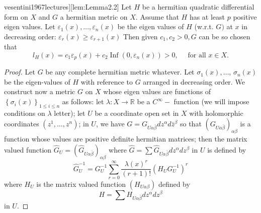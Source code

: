 \documentclass[lang=en,12pt]{beautybook}
\begin{document}
\begin{lemma}[][\cite[Lemma 2.2 by E. Calabi, P80]{vesentini1967lectures}][lem:Lemma2.2]
  Let $H$ be a hermitian quadratic differential form on $X$ and $G$ a hermitian metric on $X$. Assume that $H$ has at least $p$ positive eigen values. Let $\varepsilon_1(x), \ldots, \varepsilon_n(x)$ be the eigen values of $H$ (w.r.t.
  $G)$ at $x$ in decreasing order: $\varepsilon_r(x) \geq \varepsilon_{r+1}(x)$
  Then given $c_1, c_2>0, G$ can be so chosen that
  \begin{equation*}
  l_H(x)=c_1 \varepsilon_p(x)+c_2 \operatorname{Inf}\left(0, \varepsilon_n(x)\right)>0,\quad  \text { for all } x \in X .
  \end{equation*}
\end{lemma}

  \begin{proof}
    Let $G$ be any complete hermitian metric whatever. Let $\sigma_1(x), \ldots$, $\sigma_n(x)$ be the eigen-values of $H$ with reference to $G$ arranged in decreasing order. We construct now a metric $G$ on $X$ whose eigen values are functions of $\left\{\sigma_i(x)\right\}_{1 \leq i \leq n}$ as follows: let $\lambda: X \rightarrow \mathbb{R}$ be a $C^{\infty}-$ function (we will impose conditions on $\lambda$ letter); let $U$ be a coordinate open set in $X$ with holomorphic coordinates $\left(z^1, \ldots, z^n\right)$; in $U$, we have $G=G_{U \alpha \bar{\beta}} d z^\alpha d \bar{z}^\beta$ so that $\left(G_{U \alpha \bar{\beta}}\right)_{\alpha \beta}$ is a function whose values are positive definite hermitian matrices; then the matrix valued function $\widehat{G}_U=\left(\widehat{G}_{U \alpha \bar{\beta}}\right)_{\alpha \beta}$ where $\widehat{G}=\sum \widehat{G}_{U \alpha \bar{\beta}} d z^\alpha d z^\beta$ in $U$ is defined by
  \begin{equation*}
  \widehat{G}_U^{-1}=G_U^{-1} \sum_{r=0}^{\infty} \frac{\lambda(x)^r}{(r+1) !}\left(H_U G_U^{-1}\right)^r
  \end{equation*}
  where $H_U$ is the matrix valued function $\left(H_{U \alpha \beta}\right)$ defined by
    \begin{equation*}
    H=\sum H_{U \alpha \bar{\beta}} d z^\alpha d z^\beta
    \end{equation*}
    in $U$.


\end{proof}
\end{document}
